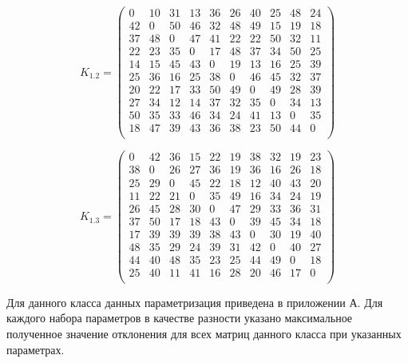 \begin{equation}
	\label{eq:kd1.2}
	K_{1.2} = \begin{pmatrix}
		0 & 10 & 31 & 13 & 36 & 26 & 40 & 25 & 48 & 24 \\
		42 & 0 & 50 & 46 & 32 & 48 & 49 & 15 & 19 & 18 \\
		37 & 48 & 0 & 47 & 41 & 22 & 22 & 50 & 32 & 11 \\
		22 & 23 & 35 & 0 & 17 & 48 & 37 & 34 & 50 & 25 \\
		14 & 15 & 45 & 43 & 0 & 19 & 13 & 16 & 25 & 39 \\
		25 & 36 & 16 & 25 & 38 & 0 & 46 & 45 & 32 & 37 \\
		20 & 22 & 17 & 33 & 50 & 49 & 0 & 49 & 28 & 39 \\
		27 & 34 & 12 & 14 & 37 & 32 & 35 & 0 & 34 & 13 \\
		50 & 35 & 33 & 46 & 34 & 24 & 41 & 13 & 0 & 35 \\
		18 & 47 & 39 & 43 & 36 & 38 & 23 & 50 & 44 & 0 \\
	\end{pmatrix}
\end{equation}

\begin{equation}
	\label{eq:kd1.3}
	K_{1.3} = \begin{pmatrix}
		0 & 42 & 36 & 15 & 22 & 19 & 38 & 32 & 19 & 23 \\
		38 & 0 & 26 & 27 & 36 & 19 & 36 & 16 & 26 & 18 \\
		25 & 29 & 0 & 45 & 22 & 18 & 12 & 40 & 43 & 20 \\
		11 & 22 & 21 & 0 & 35 & 49 & 16 & 34 & 24 & 19 \\
		26 & 45 & 28 & 30 & 0 & 47 & 29 & 33 & 36 & 31 \\
		37 & 50 & 17 & 18 & 43 & 0 & 39 & 45 & 34 & 18 \\
		17 & 39 & 39 & 39 & 38 & 43 & 0 & 30 & 19 & 40 \\
		48 & 35 & 29 & 24 & 39 & 31 & 42 & 0 & 40 & 27 \\
		44 & 40 & 48 & 35 & 23 & 25 & 44 & 49 & 0 & 18 \\
		25 & 40 & 11 & 41 & 16 & 28 & 20 & 46 & 17 & 0 \\
	\end{pmatrix}
\end{equation}

Для данного класса данных параметризация приведена в приложении А.
Для каждого набора параметров в качестве разности указано максимальное полученное значение отклонения для всех матриц данного класса при указанных параметрах.

